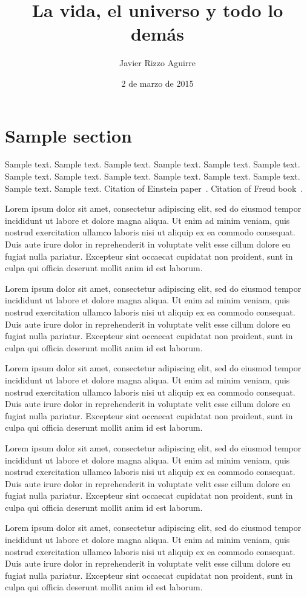 \documentclass[letterpaper, 12pt, jou, apacite]{apa6}
\title{La vida, el universo y todo lo demás}
\author{Javier Rizzo Aguirre}
\date{2 de marzo de 2015}
\begin{document}
    

    \section{Sample section}
    Sample text. Sample text. Sample text. Sample text. Sample text. Sample text. 
    Sample text. Sample text. Sample text. Sample text. Sample text. Sample text. 
    Sample text. Sample text. Citation of Einstein paper~\cite{Einstein}. Citation of Freud book~\cite{Freud}.

    Lorem ipsum dolor sit amet, consectetur adipiscing elit, sed do eiusmod tempor incididunt ut labore et dolore magna aliqua. Ut enim ad minim veniam, quis nostrud exercitation ullamco laboris nisi ut aliquip ex ea commodo consequat. Duis aute irure dolor in reprehenderit in voluptate velit esse cillum dolore eu fugiat nulla pariatur. Excepteur sint occaecat cupidatat non proident, sunt in culpa qui officia deserunt mollit anim id est laborum.

    Lorem ipsum dolor sit amet, consectetur adipiscing elit, sed do eiusmod tempor incididunt ut labore et dolore magna aliqua. Ut enim ad minim veniam, quis nostrud exercitation ullamco laboris nisi ut aliquip ex ea commodo consequat. Duis aute irure dolor in reprehenderit in voluptate velit esse cillum dolore eu fugiat nulla pariatur. Excepteur sint occaecat cupidatat non proident, sunt in culpa qui officia deserunt mollit anim id est laborum.

    Lorem ipsum dolor sit amet, consectetur adipiscing elit, sed do eiusmod tempor incididunt ut labore et dolore magna aliqua. Ut enim ad minim veniam, quis nostrud exercitation ullamco laboris nisi ut aliquip ex ea commodo consequat. Duis aute irure dolor in reprehenderit in voluptate velit esse cillum dolore eu fugiat nulla pariatur. Excepteur sint occaecat cupidatat non proident, sunt in culpa qui officia deserunt mollit anim id est laborum.

    Lorem ipsum dolor sit amet, consectetur adipiscing elit, sed do eiusmod tempor incididunt ut labore et dolore magna aliqua. Ut enim ad minim veniam, quis nostrud exercitation ullamco laboris nisi ut aliquip ex ea commodo consequat. Duis aute irure dolor in reprehenderit in voluptate velit esse cillum dolore eu fugiat nulla pariatur. Excepteur sint occaecat cupidatat non proident, sunt in culpa qui officia deserunt mollit anim id est laborum.

    Lorem ipsum dolor sit amet, consectetur adipiscing elit, sed do eiusmod tempor incididunt ut labore et dolore magna aliqua. Ut enim ad minim veniam, quis nostrud exercitation ullamco laboris nisi ut aliquip ex ea commodo consequat. Duis aute irure dolor in reprehenderit in voluptate velit esse cillum dolore eu fugiat nulla pariatur. Excepteur sint occaecat cupidatat non proident, sunt in culpa qui officia deserunt mollit anim id est laborum.
\end{document}
